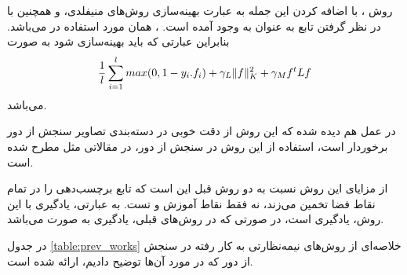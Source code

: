\documentclass[11pt]{article}
\begin{document}
روش \LapSVM{}، با اضافه کردن این جمله به عبارت بهینه‌سازی روش‌های منیفلدی، و همچنین با در نظر گرفتن تابع \hinge{} به عنوان \lossfunction{} به وجود آمده است. \lossfunction{} \hinge{}، همان \lossfunction{} مورد استفاده در \SVM{} می‌باشد. بنابراین عبارتی که باید بهینه‌سازی شود به صورت
\begin{eqnarray}
\displaystyle {1 \over l}\sum_{i=1}^l max(0,1-y_i.f_i) + \gamma_L \Vert f \Vert_K^2 + \gamma_M f^t L f
\end{eqnarray}
می‌باشد.

در عمل هم دیده شده که این روش از دقت خوبی در دسته‌بندی تصاویر سنجش از دور برخوردار است، استفاده از این روش در سنجش از دور، در مقالاتی مثل \cite{Camps_Valls_LapSVM_1,Camps_Valls_LapSVM,LapSVM_Knowledge_Transfer_1,LapSVM_Knowledge_Transfer_2} مطرح شده است. 


از مزایای این روش نسبت به دو روش قبل این است که تابع برچسب‌دهی را در تمام نقاط فضا تخمین می‌زند، نه فقط نقاط آموزش و تست. به عبارتی، یادگیری با این روش، یادگیری \inductive{}  است، در صورتی که در روش‌های قبلی، یادگیری به صورت \transductive{} می‌باشد.

در جدول \ref{table:prev_works} خلاصه‌ای از روش‌های نیمه‌نظارتی به کار رفته در سنجش از دور که در مورد آن‌ها توضیح دادیم، ارائه شده است.
\end{document}
